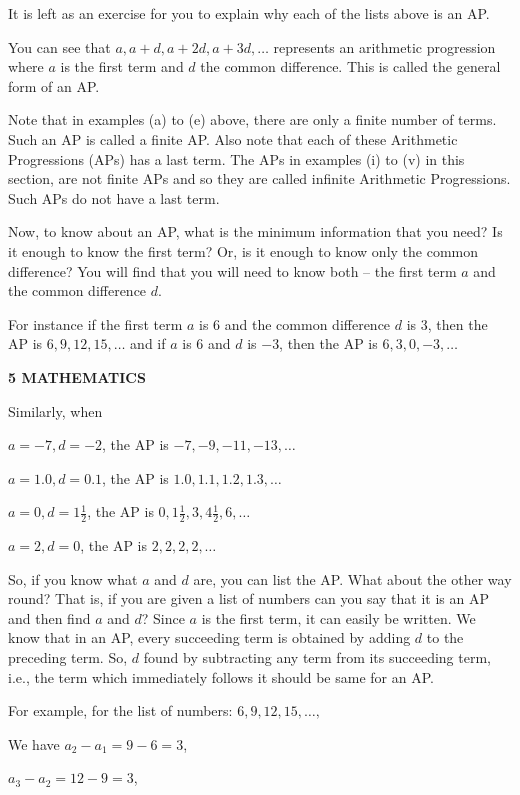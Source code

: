 \documentclass[12pt,a4paper]{book}
\begin{document}
It is left as an exercise for you to explain why each of the lists above is an AP.

You can see that
$a, a + d, a + 2d, a + 3d, \ldots$
represents an arithmetic progression where $a$ is the first term and $d$ the common
difference. This is called the general form of an AP.

Note that in examples (a) to (e) above, there are only a finite number of terms.
Such an AP is called a finite AP. Also note that each of these Arithmetic Progressions
(APs) has a last term. The APs in examples (i) to (v) in this section, are not finite APs
and so they are called infinite Arithmetic Progressions. Such APs do not have a
last term.

Now, to know about an AP, what is the minimum information that you need? Is it
enough to know the first term? Or, is it enough to know only the common difference?
You will find that you will need to know both – the first term $a$ and the common
difference $d$.

For instance if the first term $a$ is 6 and the common difference $d$ is 3, then
the AP is
$6, 9, 12, 15, \ldots$
and if $a$ is 6 and $d$ is $-$3, then the AP is
$6, 3, 0, -3, \ldots$

\newpage

\noindent\textbf{5 \hfill MATHEMATICS}

\noindent Similarly, when

$a = -7, d = -2$, the AP is $-7, -9, -11, -13, \ldots$

$a = 1.0, d = 0.1$, the AP is $1.0, 1.1, 1.2, 1.3, \ldots$

$a = 0, d = 1\frac{1}{2}$, the AP is $0, 1\frac{1}{2}, 3, 4\frac{1}{2}, 6, \ldots$

$a = 2, d = 0$, the AP is $2, 2, 2, 2, \ldots$

So, if you know what $a$ and $d$ are, you can list the AP. What about the other way
round? That is, if you are given a list of numbers can you say that it is an AP and then
find $a$ and $d$? Since $a$ is the first term, it can easily be written. We know that in an AP,
every succeeding term is obtained by adding $d$ to the preceding term. So, $d$ found by
subtracting any term from its succeeding term, i.e., the term which immediately follows
it should be same for an AP.

For example, for the list of numbers:
$6, 9, 12, 15, \ldots,$

We have $a_2 - a_1 = 9 - 6 = 3$,

$a_3 - a_2 = 12 - 9 = 3$,
\end{document}
